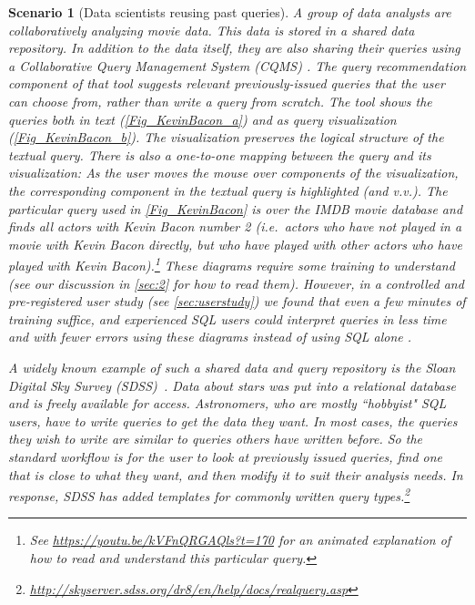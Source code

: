 \documentclass[letterpaper,11pt]{article}
\newtheorem{scenario}{Scenario}
\begin{document}
\begin{scenario}[Data scientists reusing past queries]\label{scenario:1}
	A group of data analysts 
	are collaboratively analyzing movie data.
	This data is stored in a shared data repository. 
	In addition to the data itself, they are also sharing their queries using a Collaborative Query Management System (CQMS)
	\cite{QueRIERecommendations:2010,
	ARZAMASOVA2021101646,
	DBLP:conf/ssdbm/ChatzopoulouEP09,
	Eirinaki:QueRie:2014,
	DBLP:conf/icde/FanLZ11,
	HoweC2010:SQLshare, SQLshare:2016,
	DBLP:conf/cidr/KhoussainovaBGKS09, KhoussainovaKBS:2011, LiFWWF2011:DBease,
	Marcel:QueryRecommendations:2011,
	Milo:REACT:2016}.	
	The query recommendation component of that tool suggests relevant previously-issued queries that the user can choose from, 
	rather than write a query from scratch.
	The tool shows the queries both in text (\autoref{Fig_KevinBacon_a})
	and as query visualization (\autoref{Fig_KevinBacon_b}).
	The visualization preserves the logical structure of the textual query.
	 There is also a one-to-one mapping between the query and its visualization:
	As the user moves the mouse over components of the visualization, the corresponding component in the textual query is highlighted (and v.v.).
	The particular query used in 
	\autoref{Fig_KevinBacon}
	is over the IMDB movie database and finds all actors with Kevin Bacon number 2
	(i.e.\
	actors who have not played in a movie with Kevin Bacon directly, 
	but who have played with other actors who have played with Kevin Bacon).\footnote{See \url{https://youtu.be/kVFnQRGAQls?t=170} for an animated explanation of how to read and understand  this particular query.}
%
	These diagrams require some training to understand (see our discussion in \autoref{sec:2} for how to read them). 
	However, in a controlled and pre-registered user study  (see \autoref{sec:userstudy})
	we found that even a few minutes of training
	suffice, and experienced SQL users could interpret queries \emph{in less time} and \emph{with fewer errors} 
	using these diagrams instead of using SQL alone \cite{DBLP:conf/sigmod/LeventidisZDGJR20}.




	A widely known example of such a shared data and query repository is the Sloan Digital Sky Survey (SDSS)~\cite{QueRIERecommendations:2010, SDSS}.
	Data about stars was put into a relational database and is freely available for access. 
	Astronomers, who are mostly ``hobbyist" SQL users, 
	have to write queries to get the data they want.
	In most cases, the queries they wish to write are similar to queries others have written before.  So the standard workflow is for the user 
	to look at previously issued queries, find one that is close to what they want, and then modify it to suit their analysis needs.
	In response, SDSS has added templates for commonly written query types.\footnote{\url{http://skyserver.sdss.org/dr8/en/help/docs/realquery.asp}} 
	


\end{scenario}
\end{document}
